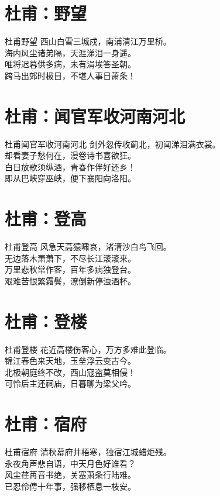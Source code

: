 \documentclass[12pt,oneside,a5paper]{book}
\begin{document}
\chapter{杜甫：野望}
\begin{poemzh}{杜甫}{野望}
西山白雪三城戍，南浦清江万里桥。\\
海内风尘诸弟隔，天涯涕泪一身遥。\\
唯将迟暮供多病，未有涓埃答圣朝。\\
跨马出郊时极目，不堪人事日萧条！\\ 
\end{poemzh}

\chapter{杜甫：闻官军收河南河北}
\begin{poemzh}{杜甫}{闻官军收河南河北}
剑外忽传收蓟北，初闻涕泪满衣裳。\\
却看妻子愁何在，漫卷诗书喜欲狂。\\
白日放歌须纵酒，青春作伴好还乡！\\
即从巴峡穿巫峡，便下襄阳向洛阳。\\ 
\end{poemzh}

\chapter{杜甫：登高}
\begin{poemzh}{杜甫}{登高}
风急天高猿啸哀，渚清沙白鸟飞回。\\
无边落木萧萧下，不尽长江滚滚来。\\
万里悲秋常作客，百年多病独登台。\\
艰难苦恨繁霜鬓，潦倒新停浊酒杯。\\ 
\end{poemzh}

\chapter{杜甫：登楼}
\begin{poemzh}{杜甫}{登楼}
花近高楼伤客心，万方多难此登临。\\
锦江春色来天地，玉垒浮云变古今。\\
北极朝庭终不改，西山寇盗莫相侵！\\
可怜后主还祠庙，日暮聊为梁父吟。\\ 
\end{poemzh}

\chapter{杜甫：宿府}
\begin{poemzh}{杜甫}{宿府}
清秋幕府井梧寒，独宿江城蜡炬残。\\
永夜角声悲自语，中天月色好谁看？\\
风尘荏苒音书绝，关塞萧条行陆难。\\
已忍伶俜十年事，强移栖息一枝安。\\ 
\end{poemzh}
\end{document}
